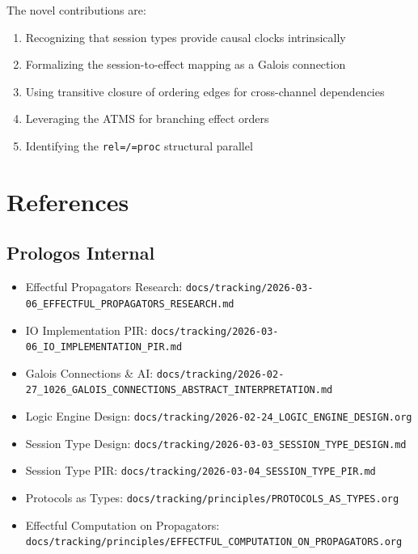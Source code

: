 \documentclass[11pt]{article}
\begin{document}
The novel contributions are:
\begin{enumerate}
\item Recognizing that session types provide causal clocks intrinsically
\item Formalizing the session-to-effect mapping as a Galois connection
\item Using transitive closure of ordering edges for cross-channel dependencies
\item Leveraging the ATMS for branching effect orders
\item Identifying the \texttt{rel=/=proc} structural parallel
\end{enumerate}
\section{References}
\label{sec:orgf51bdb4}

\subsection{Prologos Internal}
\label{sec:org10c3c44}
\begin{itemize}
\item Effectful Propagators Research: \texttt{docs/tracking/2026-03-06\_EFFECTFUL\_PROPAGATORS\_RESEARCH.md}
\item IO Implementation PIR: \texttt{docs/tracking/2026-03-06\_IO\_IMPLEMENTATION\_PIR.md}
\item Galois Connections \& AI: \texttt{docs/tracking/2026-02-27\_1026\_GALOIS\_CONNECTIONS\_ABSTRACT\_INTERPRETATION.md}
\item Logic Engine Design: \texttt{docs/tracking/2026-02-24\_LOGIC\_ENGINE\_DESIGN.org}
\item Session Type Design: \texttt{docs/tracking/2026-03-03\_SESSION\_TYPE\_DESIGN.md}
\item Session Type PIR: \texttt{docs/tracking/2026-03-04\_SESSION\_TYPE\_PIR.md}
\item Protocols as Types: \texttt{docs/tracking/principles/PROTOCOLS\_AS\_TYPES.org}
\item Effectful Computation on Propagators: \texttt{docs/tracking/principles/EFFECTFUL\_COMPUTATION\_ON\_PROPAGATORS.org}
\end{itemize}
\end{document}
